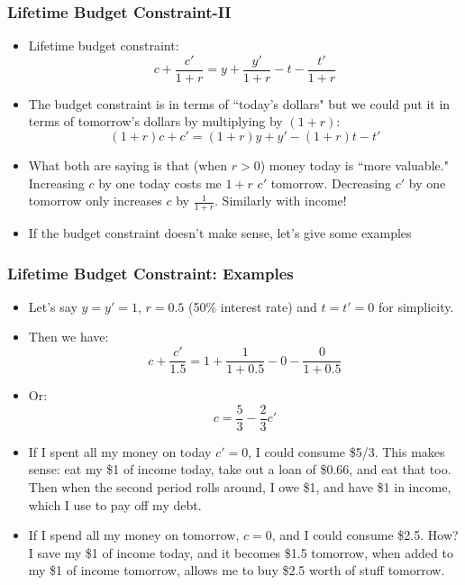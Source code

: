\documentclass{beamer}
\begin{document}
\begin{frame}
\frametitle[alignment=center]{Lifetime Budget Constraint-II}
\begin{itemize}
\item Lifetime budget constraint:
$$c+\frac{c'}{1+r}=y+\frac{y'}{1+r}-t-\frac{t'}{1+r}$$
\item The budget constraint is in terms of ``today's dollars" but we could put it in terms of tomorrow's dollars by multiplying by $(1+r)$:
$$(1+r)c+c'=(1+r)y+y'-(1+r)t-t'$$
\item What both are saying is that (when $r>0$) money today is ``more valuable."  Increasing $c$ by one today costs me $1+r$ $c'$ tomorrow.  Decreasing $c'$ by one tomorrow only increases $c$ by $\frac{1}{1+r}$.  Similarly with income!
\bigskip
\item If the budget constraint doesn't make sense, let's give some examples
\end{itemize}
\end{frame}



\begin{frame}
\frametitle[alignment=center]{Lifetime Budget Constraint: Examples}
\begin{itemize}
\item Let's say $y=y'=1$,  $r=0.5$ (50\% interest rate) and $t=t'=0$ for simplicity.
\item Then we have:
$$c+\frac{c'}{1.5}=1+\frac{1}{1+0.5}-0-\frac{0}{1+0.5}$$
\item Or:
$$c=\frac{5}{3}-\frac{2}{3}c'$$
\item If I spent all my money on today $c'=0$, I could consume \$5/3.  This makes sense:  eat my \$1 of income today, take out a loan of \$0.66, and eat that too.  Then when the second period rolls around, I owe \$1, and have \$1 in income, which I use to pay off my debt.
\item If I spend all my money on tomorrow, $c=0$, and I could consume \$2.5.  How?  I save my \$1 of income today, and it becomes \$1.5 tomorrow, when added to my \$1 of income tomorrow, allows me to buy \$2.5 worth of stuff tomorrow.
\end{itemize}
\end{frame}
\end{document}
